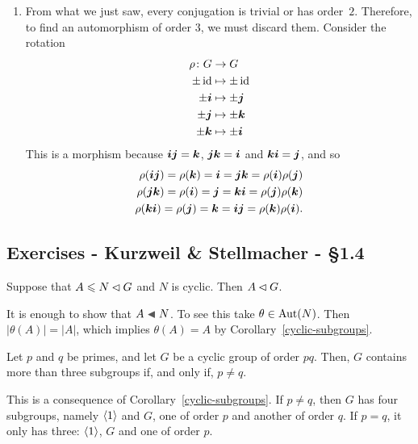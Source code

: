 \begin{solution}
\begin{enumerate}[\upshape a)]
    \item From what we just saw, every conjugation is trivial or has order~$2$. Therefore, to find an automorphism of order $3$, we must discard them. Consider the rotation
    \begin{align*}
        \rho\colon G&\to G\\
        \pm\operatorname{id}&\mapsto\pm\operatorname{id}\\
        \pm\textrm{\boldmath$i$}&\mapsto\pm\textrm{\boldmath$j$}\\
        \pm\textrm{\boldmath$j$}&\mapsto\pm\textrm{\boldmath$k$}\\
        \pm\textrm{\boldmath$k$}&\mapsto\pm\textrm{\boldmath$i$}
    \end{align*}
    This is a morphism because $\textrm{\boldmath$i$}\textrm{\boldmath$j$}=\textrm{\boldmath$k$}$, $\textrm{\boldmath$j$}\textrm{\boldmath$k$}=\textrm{\boldmath$i$}$ and $\textrm{\boldmath$k$}\textrm{\boldmath$i$}=\textrm{\boldmath$j$}$, and so
    \begin{align*}
        \rho(\textrm{\boldmath$i$}\textrm{\boldmath$j$})=\rho(\textrm{\boldmath$k$})=\textrm{\boldmath$i$}=\textrm{\boldmath$j$}\textrm{\boldmath$k$}=\rho(\textrm{\boldmath$i$})\rho(\textrm{\boldmath$j$})\\
        \rho(\textrm{\boldmath$j$}\textrm{\boldmath$k$})=\rho(\textrm{\boldmath$i$})=\textrm{\boldmath$j$}=\textrm{\boldmath$k$}\textrm{\boldmath$i$}=\rho(\textrm{\boldmath$j$})\rho(\textrm{\boldmath$k$})\\
        \rho(\textrm{\boldmath$k$}\textrm{\boldmath$i$})=\rho(\textrm{\boldmath$j$})=\textrm{\boldmath$k$}=\textrm{\boldmath$i$}\textrm{\boldmath$j$}=\rho(\textrm{\boldmath$k$})\rho(\textrm{\boldmath$i$}).
    \end{align*}
\end{enumerate}
\end{solution}

\subsection{Exercises - Kurzweil \& Stellmacher - \S 1.4}

\begin{exr}
    Suppose that\/ $A\leqslant N\lhd G$ and\/ $N$ is cyclic. Then\/ $A\lhd G$.
\end{exr}

\begin{solution} It is enough to show that $A\ch N$. To see this take $\theta\in{\rm Aut}(N)$. Then $|\theta(A)|=|A|$, which implies $\theta(A)=A$ by Corollary~\ref{cyclic-subgroups}.  \end{solution}

\begin{exr}
    Let\/ $p$ and\/ $q$ be primes, and let\/ $G$ be a cyclic group of order\/ $pq$. Then, $G$ contains more than three subgroups if, and only if, $p \neq q$.
\end{exr}

\begin{solution} This is a consequence of Corollary~\ref{cyclic-subgroups}. If $p\ne q$, then $G$ has four subgroups, namely $\langle1\rangle$ and $G$, one of order $p$ and another of order $q$. If $p=q$, it only has three: $\langle1\rangle$, $G$ and one of order $p$.  \end{solution}

